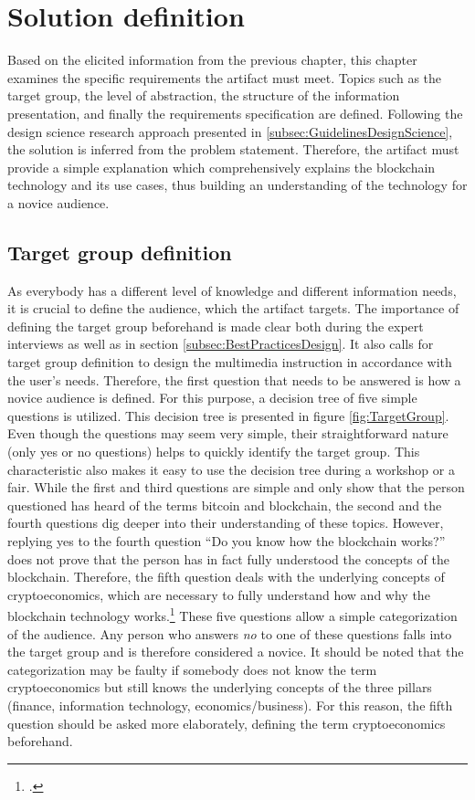 \chapter{Solution definition} \label{chapter:Solution}

Based on the elicited information from the previous chapter, this chapter examines the specific requirements the artifact must meet. Topics such as the target group, the level of abstraction, the structure of the information presentation, and finally the requirements specification are defined. Following the design science research approach presented in \ref{subsec:GuidelinesDesignScience}, the solution is inferred from the problem statement. Therefore, the artifact must provide a simple explanation which comprehensively explains the blockchain technology and its use cases, thus building an understanding of the technology for a novice audience. 

\section{Target group definition}
As everybody has a different level of knowledge and different information needs, it is crucial to define the audience, which the artifact targets. The importance of defining the target group beforehand is made clear both during the expert interviews as well as in section \ref{subsec:BestPracticesDesign}. It also calls for target group definition to design the multimedia instruction in accordance with the user's needs. Therefore, the first question that needs to be answered is how a novice audience is defined. For this purpose, a decision tree of five simple questions is utilized. This decision tree is presented in figure \ref{fig:TargetGroup}. Even though the questions may seem very simple, their straightforward nature (only yes or no questions) helps to quickly identify the target group. This characteristic also makes it easy to use the decision tree during a workshop or a fair. While the first and third questions are simple and only show that the person questioned has heard of the terms bitcoin and blockchain, the second and the fourth questions dig deeper into their understanding of these topics. However, replying yes to the fourth question \enquote{Do you know how the blockchain works?} does not prove that the person has in fact fully understood the concepts of the blockchain. Therefore, the fifth question deals with the underlying concepts of cryptoeconomics, which are necessary to fully understand how and why the blockchain technology works.\footcite[Cf.][]{RalphBeckmann_Interview} These five questions allow a simple categorization of the audience. Any person who answers \textit{no} to one of these questions falls into the target group and is therefore considered a novice. It should be noted that the categorization may be faulty if somebody does not know the term cryptoeconomics but still knows the underlying concepts of the three pillars (finance, information technology, economics/business). For this reason, the fifth question should be asked more elaborately, defining the term cryptoeconomics beforehand.


